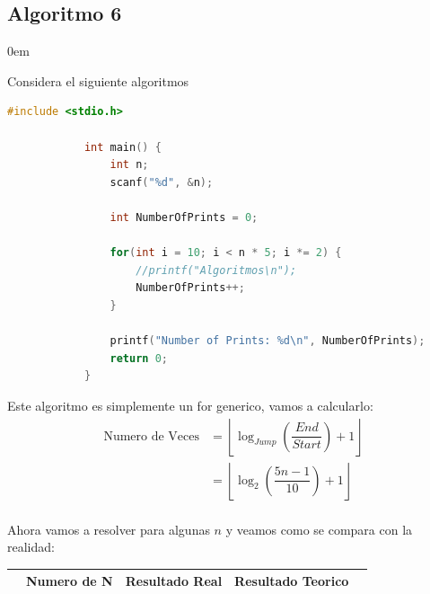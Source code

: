 \documentclass[12pt, fleqn]{article}                            %
\newenvironment{SmallIndentation}[1][0.75em]                    %
        {\begin{adjustwidth}{#1}{}\begin{footnotesize}}             %
        {\end{footnotesize}\end{adjustwidth}}                       %
\theoremstyle{break}                                            %
\newcommand{\Wrap}[1]    {\left( #1 \right)}                    %
\newcommand{\Floor}[1]{\left \lfloor #1 \right \rfloor}         %
\newcommand{\pfrac}[2]{\Wrap{\dfrac{#1}{#2}}}                   %
\begin{document}
    \clearpage
    \subsection{Algoritmo 6}
    \begin{SmallIndentation}[0em]

        Considera el siguiente algoritmos
        \begin{lstlisting}[language=C, gobble=12, basicstyle=\small\color{white}]
            #include <stdio.h>

            int main() {
                int n;
                scanf("%d", &n);

                int NumberOfPrints = 0;
                
                for(int i = 10; i < n * 5; i *= 2) {
                    //printf("Algoritmos\n");
                    NumberOfPrints++;
                }

                printf("Number of Prints: %d\n", NumberOfPrints);
                return 0;
            }
        \end{lstlisting}

        Este algoritmo es simplemente un for generico, vamos a calcularlo:
        \begin{align*}
            \text{Numero de Veces}
                &= \Floor{\log_{Jump}\pfrac{End}{Start} + 1}                \\
                &= \Floor{\log_{2}\pfrac{5n - 1}{10} + 1}                   \\
        \end{align*}

        Ahora vamos a resolver para algunas $n$ y veamos como se compara con
        la realidad:

        \begin{tabular}{r ||c |c | c |c }
            &  Numero de N & Resultado Real & Resultado Teorico & \\ [0.5ex] 
            \hline\hline
          

\end{tabular}
\end{SmallIndentation}
\end{document}
